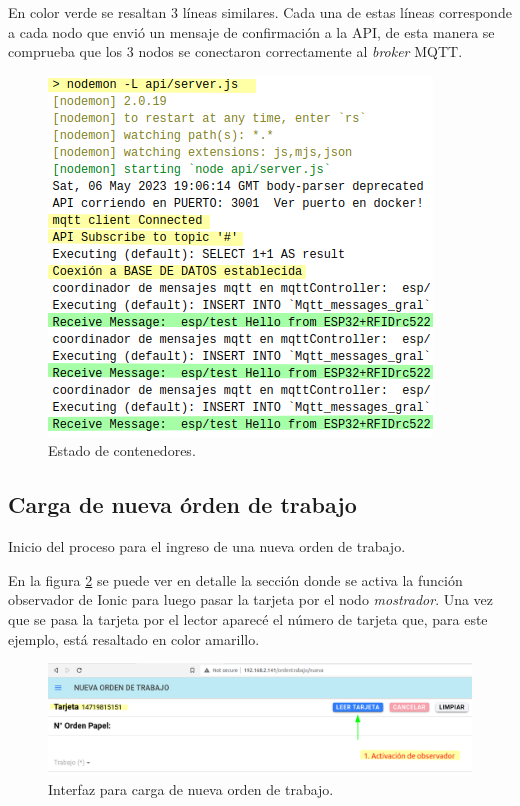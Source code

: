 En color verde se resaltan 3 líneas similares. Cada una de estas líneas corresponde a cada nodo que envió un mensaje de confirmación a la API, de esta manera se comprueba que los 3 nodos se conectaron correctamente al \textit{broker} MQTT.

\begin{figure}[H]
	\centering
	\includegraphics[scale=.90]{./Figures/ensayo-1/4.portainer-log-api.png}
	\caption{Estado de contenedores.}
	\label{fig:ensayoportainerlogapi}
\end{figure} 

\subsection{Carga de nueva órden de trabajo}
\label{subsec:ensayonuevaorden}

Inicio del proceso para el ingreso de una nueva orden de trabajo.

En la figura \ref{fig:ensayonueva1-1} se puede ver en detalle la sección donde se activa la función observador de Ionic para luego pasar la tarjeta por el nodo \textit{mostrador}. Una vez que se pasa la tarjeta por el lector aparecé el número de tarjeta que, para este ejemplo, está resaltado en color amarillo.

\begin{figure}[H]
	\centering
	\includegraphics[width=\textwidth]{./Figures/ensayo-1/5.nueva-1.png}
	\caption{Interfaz para carga de nueva orden de trabajo.}
	\label{fig:ensayonueva1-1}
\end{figure}

